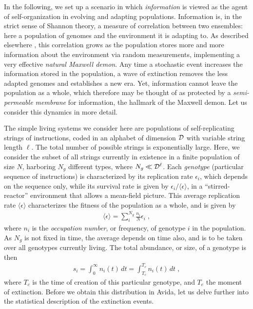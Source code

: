 \documentclass[letterpaper]{article}
\begin{document}
In the following, we set up a scenario in which {\em information} is
viewed as the agent of self-organization in evolving and adapting
populations. Information is, in the strict sense of Shannon theory, a
measure of correlation between two ensembles: here a population of
genomes and the environment it is adapting to. As described elsewhere
\citep{IAL}, this correlation grows as the population stores more and
more information about the environment via random measurements,
implementing a very effective {\em natural Maxwell demon}. Any time a
stochastic event increases the information stored in the population, a
wave of extinction removes the less adapted genomes and establishes a
new era. Yet, information cannot leave the population as a whole,
which therefore may be thought of as protected by a {\em
semi-permeable membrane} for information, the hallmark of the Maxwell
demon. Let us consider this dynamics in more detail.

The simple living systems we consider here are populations of
self-replicating strings of instructions, coded in an alphabet of
dimension ${\cal D}$ with variable string length $\ell$. The total
number of possible strings is exponentially large. Here, we consider
the subset of all strings currently in existence in a finite
population of size $N$, harboring $N_g$ different types, where
$N_g\ll{\cal D}^\ell$. Each {\em genotype} (particular sequence of
instructions) is characterized by its replication rate $\epsilon_i$,
which depends on the sequence only, while its survival rate is given
by $\epsilon_i/\langle \epsilon\rangle$, in a ``stirred-reactor''
environment that allows a mean-field picture. This average replication
rate $\langle \epsilon\rangle$ characterizes the fitness of the
population as a whole, and is given by
\begin{eqnarray}
\langle \epsilon\rangle=\sum_i^{N_g}\frac{n_i}N \epsilon_i\;,
\end{eqnarray}
where $n_i$ is the {\em occupation number}, or frequency, of genotype
$i$ in the population. As $N_g$ is not fixed in time, the average
depends on time also, and is to be taken over all genotypes currently
living. The total abundance, or size, of a genotype is then
\begin{eqnarray}
s_i=\int_0^\infty n_i(t)\, dt=\int_{T_c}^{T_e}n_i(t)\, dt\;,
\label{size}
\end{eqnarray}
where $T_c$ is the time of creation of this particular genotype, and
$T_e$ the moment of extinction. Before we obtain this distribution in
Avida, let us delve further into the statistical description of the
extinction events.
\end{document}
